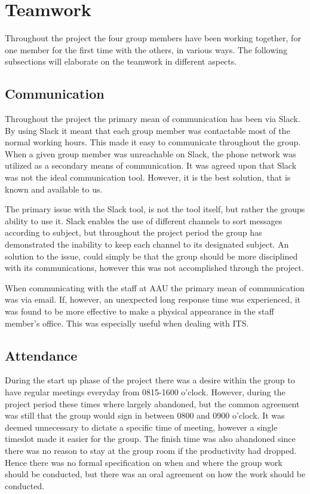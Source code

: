 \section{Teamwork}
Throughout the project the four group members have been working together, for one member for the first time with the others, in various ways.
The following subsections will elaborate on the teamwork in different aspects.

\subsection{Communication}
Throughout the project the primary mean of communication has been via Slack.
By using Slack it meant that each group member was contactable most of the normal working hours.
This made it easy to communicate throughout the group.
When a given group member was unreachable on Slack, the phone network was utilized as a secondary means of communication.
It was agreed upon that Slack was not the ideal communication tool.
However, it is the best solution, that is known and available to us.

The primary issue with the Slack tool, is not the tool itself, but rather the groups ability to use it. 
Slack enables the use of different channels to sort messages according to subject, but throughout the project period the group has demonstrated the inability to keep each channel to its designated subject. 
An solution to the issue, could simply be that the group should be more disciplined with its communications, however this was not accomplished through the project.

When communicating with the staff at AAU the primary mean of communication was via email.
If, however, an unexpected long response time was experienced, it was found to be more effective to make a physical appearance in the staff member's office.
This was especially useful when dealing with ITS.

\subsection{Attendance}
During the start up phase of the project there was a desire within the group to have regular meetings everyday from 0815-1600 o'clock.
However, during the project period these times where largely abandoned, but the common agreement was still that the group would sign in between 0800 and 0900 o'clock.
It was deemed unnecessary to dictate a specific time of meeting, however a single timeslot made it easier for the group.
The finish time was also abandoned since there was no reason to stay at the group room if the productivity had dropped.
Hence there was no formal specification on when and where the group work should be conducted, but there was an oral agreement on how the work should be conducted.
